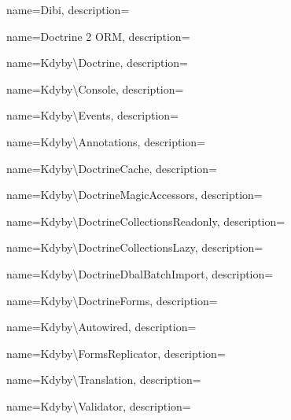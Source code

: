 
 {
  name={Dibi},
  description={} }

 {
  name={Doc\-tri\-ne 2 ORM},
  description={} }

 {
  name={Kdy\-by\textbackslash{}Doc\-tri\-ne},
  description={} }

 {
  name={Kdy\-by\textbackslash{}Con\-so\-le},
  description={} }

 {
  name={Kdy\-by\textbackslash{}E\-ven\-ts},
  description={} }

 {
  name={Kdy\-by\textbackslash{}Anno\-ta\-ti\-on\-s},
  description={} }

 {
  name={Kdy\-by\textbackslash{}Doc\-tri\-ne\-Ca\-che},
  description={} }

 {
  name={Kdy\-by\textbackslash{}Doc\-tri\-ne\-Ma\-gic\-Acces\-sor\-s},
  description={} }

 {
  name={Kdy\-by\textbackslash{}Doc\-tri\-ne\-Collec\-ti\-ons\-Read\-on\-ly},
  description={} }

 {
  name={Kdy\-by\textbackslash{}Doc\-tri\-ne\-Collec\-ti\-ons\-La\-zy},
  description={} }

 {
  name={Kdy\-by\textbackslash{}Doc\-tri\-ne\-Dbal\-Batch\-Im\-port},
  description={} }

 {
  name={Kdy\-by\textbackslash{}Doc\-tri\-ne\-Forms},
  description={} }

 {
  name={Kdy\-by\textbackslash{}Auto\-wi\-red},
  description={} }

 {
  name={Kdy\-by\textbackslash{}Forms\-Re\-pli\-ca\-tor},
  description={} }

 {
  name={Kdy\-by\textbackslash{}Tran\-sla\-tion},
  description={} }

 {
  name={Kdy\-by\textbackslash{}Va\-li\-da\-tor},
  description={} }

